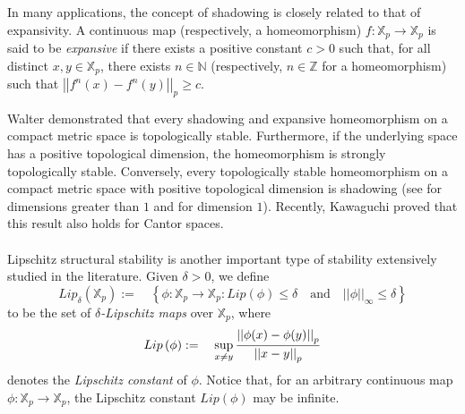 \documentclass[a4paper, 12pt]{article}
\theoremstyle{definition}
\begin{document}
	
	In many applications, the concept of shadowing is closely related to that of expansivity. A continuous map (respectively, a homeomorphism) $f: \mathbb{X}_{p} \to \mathbb{X}_{p}$ is said to be \textit{expansive} if there exists a positive constant $c > 0$ such that, for all distinct $x,y \in \mathbb{X}_{p}$, there exists $n \in \mathbb{N} $ (respectively, $n \in \mathbb{Z} $ for a homeomorphism) such that $  \left| \left|  f^{n} \left(  x  \right)  -  f^{n} \left(  y  \right)   \right|  \right|_{p} \ge c $. 
	
	
	\smallskip
	
	Walter \cite{Walters_On_the_Pseudo_Orbit_Tracing_Property_and_its_relationship_to_Stability} demonstrated that every shadowing and expansive homeomorphism on a compact metric space is topologically stable. Furthermore, if the underlying space has a positive topological dimension, the homeomorphism is strongly topologically stable. Conversely, every topologically stable homeomorphism on a compact metric space with positive topological dimension is shadowing (see \cite{Walters_On_the_Pseudo_Orbit_Tracing_Property_and_its_relationship_to_Stability} for dimensions greater than $1$ and \cite{Morimoto-Stochastically_Stable_Diffeomorphisms_and_Takens_Conjecture} for dimension $1$). Recently, Kawaguchi \cite{Kawaguchi_Topological_Stability_and_Shadowing_of_Zero-dimensional_Dynamical_Systems} proved that this result also holds for Cantor spaces. 
	
	
	
	
	\paragraph{}
	
	Lipschitz structural stability is another important type of stability extensively studied in the literature. Given $\delta  >0$, we define  
	$$ Lip_{\delta} \left(  \mathbb{X}_{p}  \right)  := \quad  \left\{  \phi : \mathbb{X}_{p} \to \mathbb{X}_{p}:   Lip \left(  \phi  \right)  \le \delta \quad  
	\text{and} \quad  \left| \left|  \phi  \right|  \right|_{ \infty } \le \delta   \right\}  $$ 
	to be the set of \textit{$\delta$-Lipschitz maps} over $\mathbb{X}_{p}$, where  
	$$ Lip \left(  \phi  \right)  := \quad \sup_{x  \neq y} {  \left| \left|   \phi(x) - \phi(y)  \right|  \right|_{p} \over  \left| \left|  x  -y  \right|  \right|_{p} }  $$
	denotes the \textit{Lipschitz constant} of $\phi$. Notice that, for an arbitrary continuous map $\phi: \mathbb{X}_{p} \to \mathbb{X}_{p}$, the Lipschitz constant $Lip \left(  \phi  \right) $ may be infinite. 
	
\end{document}
